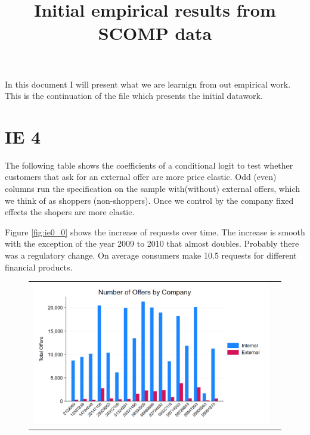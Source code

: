 \documentclass[12pt]{article}
\begin{document}
\title{Initial empirical results from SCOMP data}

\maketitle

In this document I will present what we are learnign from out empirical work. This is the continuation of the file which presents the initial datawork. 

\section{IE 4}

The following table shows the coefficients of a conditional logit to test whether customers that ask for an external offer are more price elastic. Odd (even) columns run the specification on the sample with(without) external offers, which we think of as shoppers (non-shoppers). Once we control by the company fixed effects the shopers are more elastic. 


 
\newpage 








Figure \ref{fig:ie0_0} shows the increase of requests over time. The increase is smooth with the exception of the year 2009 to 2010 that almost doubles. Probably there was a regulatory change. 
On average consumers make 10.5 requests for different financial products.
 

\begin{figure}[H]
\caption{}
 \label{fig:ie4_1}
\centering{}%
\begin{tabular}{cc}
\includegraphics[scale=0.27]{figures/IE4/IE4_int_ext_offers_by_cia.png} 
\end{tabular}
\end{figure}
\end{document}
